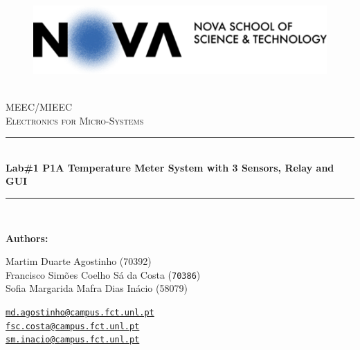 \documentclass[12pt]{article}
\newcommand{\HRule}{\rule{\linewidth}{0.5mm}} %
\begin{document}





\begin{center}
    \begin{figure}
        \vspace{-1.0cm}
        \includegraphics[scale = 1, left]{NovaFct.png} %
    \end{figure}

    \mbox{}\\[2.0cm]
    \textsc{\Huge MEEC/MIEEC}\\[2.5cm]
    \textsc{\LARGE Electronics for Micro-Systems}\\[2.0cm]
    \HRule\\[0.4cm]
    {\large \bf { Lab\#1 P1\linebreak A Temperature Meter
    System with 3 Sensors,
    Relay and GUI
    }}\\[0.2cm] %
    \HRule\\[1.5cm]
\end{center}

\begin{flushleft}
    \textbf{Authors:}
\end{flushleft}

\begin{center}
    \begin{minipage}{0.5\textwidth}
        \begin{flushleft}
            Martim Duarte Agostinho (70392)\\
            Francisco Simões Coelho Sá da Costa   (\texttt{70386})\\
            Sofia Margarida Mafra Dias Inácio (58079)\\
        \end{flushleft}
    \end{minipage}%
    \begin{minipage}{0.5\textwidth}
        \begin{flushright}
            \href{mailto:md.agostinho@campus.fct.unl.pt}{\texttt{md.agostinho@campus.fct.unl.pt}}\\
            \href{mailto:fsc.costa@campus.fct.unl.pt}{\texttt{fsc.costa@campus.fct.unl.pt}}\\
            \href{mailto:sm.inacio@campus.fct.unl.pt}{\texttt{sm.inacio@campus.fct.unl.pt}}
        \end{flushright}
    \end{minipage}
\end{center}
 
\end{document}
